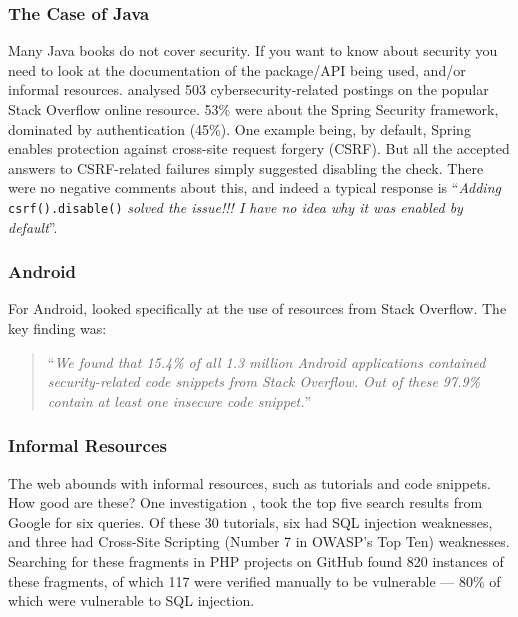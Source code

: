 \documentclass[a4paper,11pt]{article}
\begin{document}
\subsubsection*{The Case of Java}\label{sec:Java}

Many Java books do not cover security.  If you want to know about security you need to look at the documentation of the package/API being used, and/or  informal resources. \cite{Mengetal2018a} analysed 503 cybersecurity-related postings on the popular Stack Overflow online resource. 53\% were about the Spring Security framework, dominated by authentication (45\%). One example being, by default, Spring enables protection against cross-site request forgery (CSRF). But all the accepted answers to CSRF-related failures simply suggested disabling the check. There were no negative comments about this, and indeed a typical response is ``{\emph{Adding}} \verb!csrf().disable()!
{\emph{{solved the issue!!! I have no idea why it was enabled by default}}''. }

\subsubsection*{Android}\label{sec:Android}

For Android, \cite{Fischeretal2017a} looked specifically at the use of resources from Stack Overflow. The key finding was:

\begin{quote}
``{\emph{We found that 15.4\% of all 1.3 million Android applications
contained security-related code snippets from
Stack Overflow. Out of these 97.9\% contain at least one
insecure code snippet.}}''
\end{quote}

\subsubsection*{Informal Resources}\label{sec:informal}

The web abounds with informal resources, such as tutorials and code snippets. How good are these? One investigation \cite{Unruhetal2017a}, took the top five search results from Google for six queries. Of these 30 tutorials, six had SQL injection weaknesses, and three had Cross-Site Scripting (Number 7 in OWASP's Top Ten) weaknesses. Searching for these fragments in PHP projects on GitHub found 820 instances of these fragments, of which 117 were verified manually to be vulnerable --- 80\% of which were vulnerable to SQL injection. 
\end{document}

